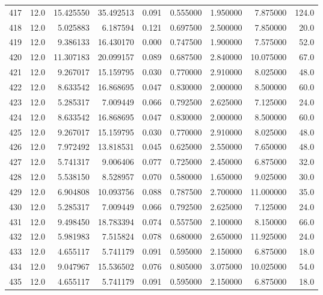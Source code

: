 \begin{tabular}{lrrrrrrrr}
417  &   12.0 &  15.425550 &  35.492513 &  0.091 &  0.555000 &  1.950000 &   7.875000 &  124.0 \\
418  &   12.0 &   5.025883 &   6.187594 &  0.121 &  0.697500 &  2.500000 &   7.850000 &   20.0 \\
419  &   12.0 &   9.386133 &  16.430170 &  0.000 &  0.747500 &  1.900000 &   7.575000 &   52.0 \\
420  &   12.0 &  11.307183 &  20.099157 &  0.089 &  0.687500 &  2.840000 &  10.075000 &   67.0 \\
421  &   12.0 &   9.267017 &  15.159795 &  0.030 &  0.770000 &  2.910000 &   8.025000 &   48.0 \\
422  &   12.0 &   8.633542 &  16.868695 &  0.047 &  0.830000 &  2.000000 &   8.500000 &   60.0 \\
423  &   12.0 &   5.285317 &   7.009449 &  0.066 &  0.792500 &  2.625000 &   7.125000 &   24.0 \\
424  &   12.0 &   8.633542 &  16.868695 &  0.047 &  0.830000 &  2.000000 &   8.500000 &   60.0 \\
425  &   12.0 &   9.267017 &  15.159795 &  0.030 &  0.770000 &  2.910000 &   8.025000 &   48.0 \\
426  &   12.0 &   7.972492 &  13.818531 &  0.045 &  0.625000 &  2.550000 &   7.650000 &   48.0 \\
427  &   12.0 &   5.741317 &   9.006406 &  0.077 &  0.725000 &  2.450000 &   6.875000 &   32.0 \\
428  &   12.0 &   5.538150 &   8.528957 &  0.070 &  0.580000 &  1.650000 &   9.025000 &   30.0 \\
429  &   12.0 &   6.904808 &  10.093756 &  0.088 &  0.787500 &  2.700000 &  11.000000 &   35.0 \\
430  &   12.0 &   5.285317 &   7.009449 &  0.066 &  0.792500 &  2.625000 &   7.125000 &   24.0 \\
431  &   12.0 &   9.498450 &  18.783394 &  0.074 &  0.557500 &  2.100000 &   8.150000 &   66.0 \\
432  &   12.0 &   5.981983 &   7.515824 &  0.078 &  0.680000 &  2.650000 &  11.925000 &   24.0 \\
433  &   12.0 &   4.655117 &   5.741179 &  0.091 &  0.595000 &  2.150000 &   6.875000 &   18.0 \\
434  &   12.0 &   9.047967 &  15.536502 &  0.076 &  0.805000 &  3.075000 &  10.025000 &   54.0 \\
435  &   12.0 &   4.655117 &   5.741179 &  0.091 &  0.595000 &  2.150000 &   6.875000 &   18.0 \\

\end{tabular}
